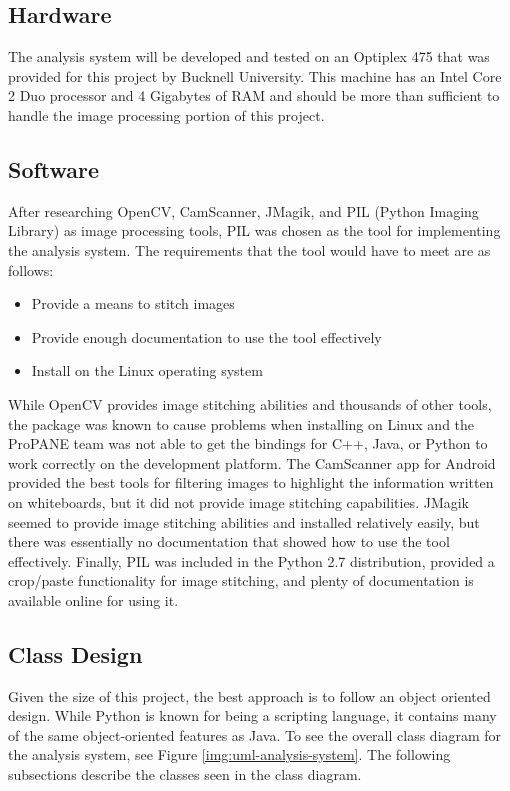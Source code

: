 \documentclass[]{article}
\begin{document}
		\subsection{Hardware}
			The analysis system will be developed and tested on an Optiplex 475 that was provided for this project by Bucknell University. This machine has an Intel Core 2 Duo processor and 4 Gigabytes of RAM and should be more than sufficient to handle the image processing portion of this project. 
		\subsection{Software}
			After researching OpenCV, CamScanner, JMagik, and PIL (Python Imaging Library) as image processing tools, PIL was chosen as the tool for implementing the analysis system. The requirements that the tool would have to meet are as follows:
			\begin{itemize}
				\item Provide a means to stitch images
				\item Provide enough documentation to use the tool effectively
				\item Install on the Linux operating system
			\end{itemize}
			
			While OpenCV provides image stitching abilities and thousands of other tools, the package was known to cause problems when installing on Linux and the ProPANE team was not able to get the bindings for C++, Java, or Python to work correctly on the development platform. The CamScanner app for Android provided the best tools for filtering images to highlight the information written on whiteboards, but it did not provide image stitching capabilities. JMagik seemed to provide image stitching abilities and installed relatively easily, but there was essentially no documentation that showed how to use the tool effectively. Finally, PIL was included in the Python 2.7 distribution, provided a crop/paste functionality for image stitching, and plenty of documentation is available online for using it. 
			
		\subsection{Class Design}
			Given the size of this project, the best approach is to follow an object oriented design. While Python is known for being a scripting language, it contains many of the same object-oriented features as Java. To see the overall class diagram for the analysis system, see Figure \ref{img:uml-analysis-system}. The following subsections describe the classes seen in the class diagram. 
			
\end{document}
